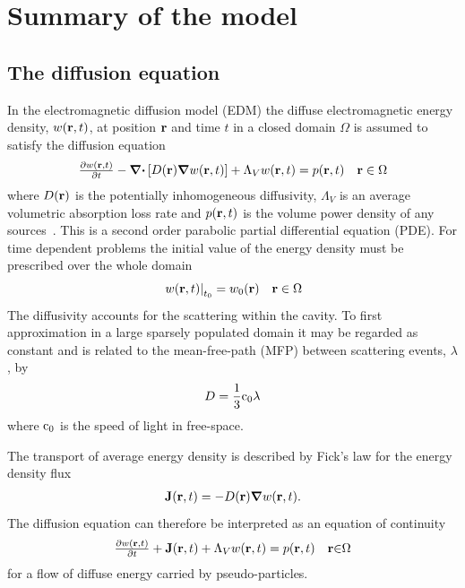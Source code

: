 \documentclass[a4paper]{article}
\numberwithin{equation}{section}
\begin{document}
\newpage

\section[Summary of the model]{Summary of the model}
\label{sc:sum}

\subsection[The diffusion equation]{The diffusion equation}
\label{sc:sum:edm}

In the electromagnetic diffusion model (EDM) the diffuse electromagnetic energy
density, $w(\boldsymbol{\mathrm{r}},t)$, at position $\boldsymbol{\mathrm{r}}$ and time $t$ in a closed
domain $\Omega$ is assumed to satisfy the diffusion equation
\begin{align}
\begin{matrix}
\frac{\partial w(\boldsymbol{\mathrm{r}},t)}{\partial t} - \boldsymbol{\mathrm{\nabla}}\boldsymbol{\mathrm{\cdot}}\left[D(\boldsymbol{\mathrm{r}}) \boldsymbol{\mathrm{\nabla}} w(\boldsymbol{\mathrm{r}},t) \right] + \Lambda_V w(\boldsymbol{\mathrm{r}},t) = p(\boldsymbol{\mathrm{r}},t) &\boldsymbol{\mathrm{r}}\in\Omega 
\end{matrix}
\end{align}
where $D(\boldsymbol{\mathrm{r}})$ is the potentially inhomogeneous diffusivity, $\Lambda_V$ is an 
average volumetric absorption loss rate and  $p(\boldsymbol{\mathrm{r}},t)$ is the volume power density 
of any sources~\citep{Picaut1999,Valeau2006,Navarro2015,Savioja2015}. This is a second order parabolic partial differential equation (PDE).
For time dependent problems the initial value of the energy density must be
prescribed over the whole domain
\begin{align}
\begin{matrix}
\left.w(\boldsymbol{\mathrm{r}},t)\right|_{t_0} = w_0(\boldsymbol{\mathrm{r}}) &\boldsymbol{\mathrm{r}}\in\Omega
\end{matrix}
\end{align}
The diffusivity accounts for the scattering within the cavity. To first
approximation in a large sparsely populated domain it may be regarded as constant and 
is related to the mean-free-path (MFP) between scattering events, $\lambda$, by
\begin{align}
D = \frac{1}{3}\mathrm{c}_0\lambda 
\end{align}
where $\mathrm{c}_0$ is the speed of light in free-space. 

The transport of average energy density is described by Fick’s law for the
energy density flux
\begin{align}
\boldsymbol{\mathrm{J}}(\boldsymbol{\mathrm{r}},t) = -D(\boldsymbol{\mathrm{r}})\boldsymbol{\mathrm{\nabla}} w(\boldsymbol{\mathrm{r}},t) .
\end{align}
The diffusion equation can therefore be interpreted as an equation of continuity
\begin{align}
\begin{matrix}
\frac{\partial w(\boldsymbol{\mathrm{r}},t)}{\partial t} +\boldsymbol{\mathrm{J}}(\boldsymbol{\mathrm{r}},t) + \Lambda_V w(\boldsymbol{\mathrm{r}},t)= p(\boldsymbol{\mathrm{r}},t) &\boldsymbol{\mathrm{r}}{\in}\Omega
\end{matrix}
\end{align}
for a flow of diffuse energy carried by pseudo-particles.
\end{document}
